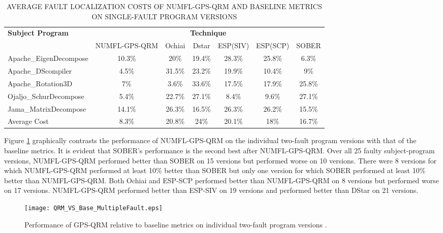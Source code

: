 \begin{table}[htbp!]
\fontsize{8pt}{9pt}\selectfont
\centering
\caption{AVERAGE FAULT LOCALIZATION COSTS OF NUMFL-GPS-QRM AND BASELINE METRICS ON SINGLE-FAULT PROGRAM VERSIONS}
\label{table4}
      \begin{tabular}{|l|c|c|c|c|c|c|}
      \hline
\multirow{2}{*}{{\bf Subject Program}}	&	\multicolumn{6}{|c|}{{\bf Technique}}	\\	\cline{2-7}
&{NUMFL-GPS-QRM}	&Ochiai&	Dstar&	ESP(SIV) &	ESP(SCP)	&SOBER \\\hline
Apache\_EigenDecompose	&	10.3\%	&	20\%	&	19.4\%	&	28.3\%	&	25.8\%	&	6.3\%	\\	\hline
Apache\_DScompiler	&	4.5\%	&	31.5\%	&	23.2\%	&	19.9\%	&	10.4\%	&	9\%	\\	\hline
Apache\_Rotation3D	&	7\%	&	3.6\%	&	33.6\%	&	17.5\%	&	17.9\%	&	25.8\%	\\	\hline
Ojaljo\_SchurDecompose	&	5.4\%	&	22.7\%	&	27.1\%	&	8.4\%	&	9.6\%	&	27.1\%	\\	\hline
Jama\_MatrixDecompose	&	14.1\%	&	26.3\%	&	16.5\%	&	26.3\%	&	26.2\%	&	15.5\%	\\	\hline
Average Cost	&	8.3\%	&	20.8\%	&	24\%	&	20.1\%	&	18\%	&	16.7\%	\\	\hline
\end{tabular}
\end{table}

Figure \ref{QRM_VS_Base_MultipleFault} graphically contrasts the performance of NUMFL-GPS-QRM on the individual two-fault program versions with that of the baseline metrics.  It is evident that SOBER's performance is the second best after NUMFL-GPS-QRM.  Over all 25 faulty subject-program versions, NUMFL-GPS-QRM performed better than SOBER on 15 versions but performed worse on 10 versions.  There were 8 versions for which NUMFL-GPS-QRM performed at least 10\% better than SOBER but only one version for which SOBER performed at least 10\% better than NUMFL-GPS-QRM.  Both Ochiai and ESP-SCP performed better than NUMFL-GPS-QRM on 8 versions but performed worse on 17 versions.  NUMFL-GPS-QRM performed better than ESP-SIV on 19 versions and performed better than DStar on 21 versions.
\begin{figure}[!thpb]
\centering
\texttt{[image: QRM\_VS\_Base\_MultipleFault.eps]}
\caption{Performance of GPS-QRM relative to baseline metrics on individual two-fault program versions .}
\label{QRM_VS_Base_MultipleFault}
\end{figure}

